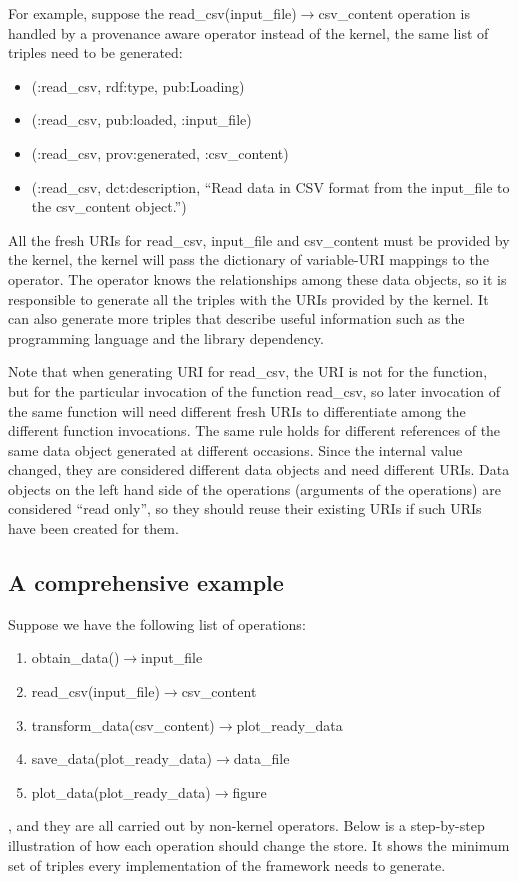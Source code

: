 For example, suppose the read\_csv(input\_file)$\rightarrow$csv\_content operation is handled by a provenance aware operator instead of the kernel, the same list of triples need to be generated:
\begin{itemize}
	\item (:read\_csv, rdf:type, pub:Loading)
	\item (:read\_csv, pub:loaded, :input\_file)
	\item (:read\_csv, prov:generated, :csv\_content)
	\item (:read\_csv, dct:description, ``Read data in CSV format from the input\_file to the csv\_content object.'')
\end{itemize}
All the fresh URIs for read\_csv, input\_file and csv\_content must be provided by the kernel, the kernel will pass the dictionary of variable-URI mappings to the operator. The operator knows the relationships among these data objects, so it is responsible to generate all the triples with the URIs provided by the kernel. It can also generate more triples that describe useful information such as the programming language and the library dependency.

Note that when generating URI for read\_csv, the URI is not for the function, but for the particular invocation of the function read\_csv, so later invocation of the same function will need different fresh URIs to differentiate among the different function invocations. The same rule holds for different references of the same data object generated at different occasions. Since the internal value changed, they are considered different data objects and need different URIs. Data objects on the left hand side of the operations (arguments of the operations) are considered ``read only'', so they should reuse their existing URIs if such URIs have been created for them.

\subsection{A comprehensive example}
\label{sec:example}
Suppose we have the following list of operations:
\begin{enumerate}
	\item obtain\_data()$\rightarrow$input\_file
	\item read\_csv(input\_file)$\rightarrow$csv\_content
	\item transform\_data(csv\_content)$\rightarrow$plot\_ready\_data
	\item save\_data(plot\_ready\_data)$\rightarrow$data\_file
	\item plot\_data(plot\_ready\_data)$\rightarrow$figure
\end{enumerate}
, and they are all carried out by non-kernel operators. Below is a step-by-step illustration of how each operation should change the store. It shows the minimum set of triples every implementation of the framework needs to generate.

